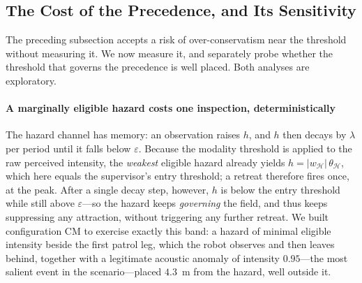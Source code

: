 \subsection{The Cost of the Precedence, and Its Sensitivity}
\label{sec:precedence-cost}
The preceding subsection accepts a risk of over-conservatism near the threshold
without measuring it. We now measure it, and separately probe whether the threshold
that governs the precedence is well placed. Both analyses are exploratory.

\paragraph*{A marginally eligible hazard costs one inspection, deterministically}
The hazard channel has memory: an observation raises $h$, and $h$ then decays by
$\lambda$ per period until it falls below $\varepsilon$. Because the modality
threshold is applied to the raw perceived intensity, the \emph{weakest} eligible
hazard already yields $h=|w_{\mathcal{H}}|\,\theta_{\mathcal{H}}$, which here equals
the supervisor's entry threshold; a retreat therefore fires once, at the peak. After
a single decay step, however, $h$ is below the entry threshold while still above
$\varepsilon$---so the hazard keeps \emph{governing} the field, and thus keeps
suppressing any attraction, without triggering any further retreat. We built
configuration CM to exercise exactly this band: a hazard of minimal eligible
intensity beside the first patrol leg, which the robot observes and then leaves
behind, together with a legitimate acoustic anomaly of intensity $0.95$---the most
salient event in the scenario---placed $4.3$~m from the hazard, well outside it.

